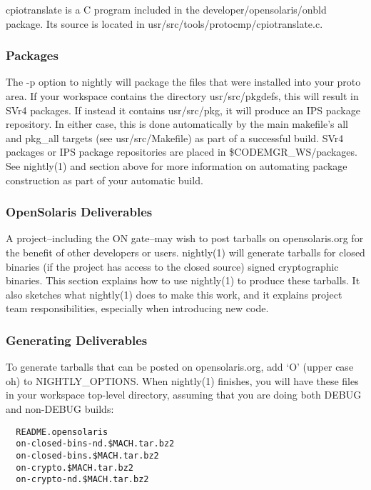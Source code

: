 \documentclass{article}
\begin{document}
cpiotranslate is a C program included in the developer/opensolaris/onbld
package. Its source is located in usr/src/tools/protocmp/cpiotranslate.c.

\subsubsection*{Packages}

The -p option to nightly will package the files that were installed into your
proto area.  If your workspace contains the directory usr/src/pkgdefs, this
will result in SVr4 packages.  If instead it contains usr/src/pkg, it will
produce an IPS package repository.  In either case, this is done automatically
by the main makefile's all and pkg\_all targets (see usr/src/Makefile) as part
of a successful build.  SVr4 packages or IPS package repositories are placed in
\${CODEMGR\_WS}/packages. See nightly(1) and section above for more information on
automating package construction as part of your automatic build.

\subsubsection*{OpenSolaris Deliverables}

A project--including the ON gate--may wish to post tarballs on opensolaris.org
for the benefit of other developers or users. nightly(1) will generate tarballs
for closed binaries (if the project has access to the closed source)
signed cryptographic binaries.
This section explains how to use nightly(1) to produce these tarballs.  It also
sketches what nightly(1) does to make this work, and it explains project team
responsibilities, especially when introducing new code.

\subsubsection*{Generating Deliverables}

To generate tarballs that can be posted on opensolaris.org, add `O' (upper case
oh) to NIGHTLY\_OPTIONS.  When nightly(1) finishes, you will have these files in
your workspace top-level directory, assuming that you are doing both DEBUG and
non-DEBUG builds:

\begin{verbatim}
  README.opensolaris
  on-closed-bins-nd.$MACH.tar.bz2
  on-closed-bins.$MACH.tar.bz2
  on-crypto.$MACH.tar.bz2
  on-crypto-nd.$MACH.tar.bz2
\end{verbatim}
\end{document}
